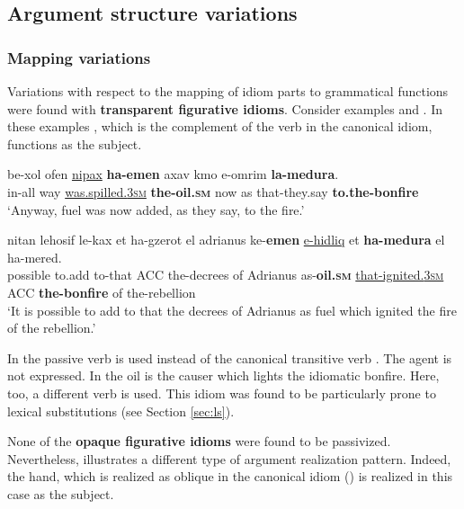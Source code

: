 \documentclass[output=paper]{langsci/langscibook}
\begin{document}
\subsection{Argument structure variations}
\label{sec:asv}

\subsubsection{Mapping variations}
\label{sec:mapping}


Variations with respect to the mapping of idiom parts to grammatical functions were found with \textbf{transparent figurative idioms}. Consider examples  and . In these examples , which is the complement of the verb in the canonical idiom, functions as the subject.

	\ea\label{medura-passive}
    	\gll be-xol {\alef}ofen \underline{ni{\shin}pax} \textbf{ha-{\shin}emen} {\ayin}ax{\shin}av kmo {\shin}e-{\alef}omrim \textbf{la-medura}.\\
    	   in-all way \underline{was.spilled.\textsc{3sm}} \textbf{the-oil.\textsc{sm}} now as that-they.say \textbf{to.the-bonfire}\\
    	\glt `Anyway, fuel was now added, as they say, to the fire.'
	\z

	\ea\label{medura-rev}
    	\gll nitan lehosif le-kax {\alef}et ha-gzerot {\shin}el {\alef}adri{\alef}anus ke-\textbf{{\shin}emen} \underline{{\shin}e-hidliq} {\alef}et \textbf{ha-medura} {\shin}el ha-mered.\\
    	   possible to.add to-that ACC the-decrees of Adrianus as-\textbf{oil.\textsc{sm}} \underline{that-ignited.\textsc{3sm}} ACC \textbf{the-bonfire} of the-rebellion \\
    	\glt `It is possible to add to that the decrees of Adrianus as fuel which ignited the fire of the rebellion.'
	\z

In  the passive verb  is used instead of the canonical transitive verb . The agent is not expressed. In  the oil is the causer which lights the idiomatic bonfire. Here, too, a different verb is used. This idiom was found to be particularly prone to lexical substitutions (see Section \ref{sec:ls}).

None of the \textbf{opaque figurative idioms} were found to be passivized. Nevertheless,  illustrates a different type of argument realization pattern. Indeed, the hand, which is realized as oblique in the canonical idiom () is realized in this case as the subject.
\end{document}
